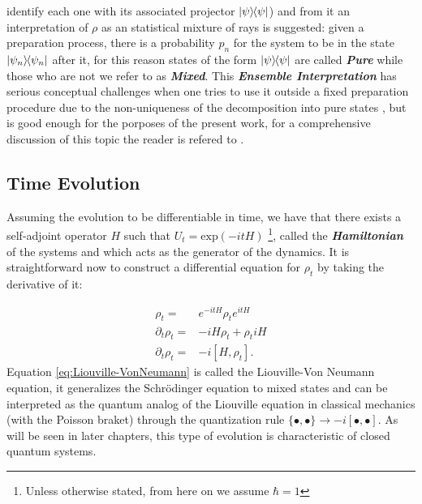 identify each one with its associated projector $\ketbra{\psi}$) and from it an  interpretation of $\rho$ as an statistical mixture of rays is
suggested: given a preparation process, there is a probability $p_{n}$ for the system to be in the state $\ketbra{\psi_{n}}$ after it, for this
reason states of the form $\ketbra{\psi}$ are called \textbf{\textit{Pure}} while those who are not we refer to as \textbf{\textit{Mixed}}.
This \textbf{\textit{Ensemble Interpretation}} has serious conceptual challenges when one tries to use it outside a
fixed preparation procedure due to the non-uniqueness of the decomposition into pure states \cite{nielsen_quantum_2010},
but is good enough for the porposes of the present work, for a comprehensive discussion of this
topic the reader is refered to \cite{schlosshauer_decoherence_2007}.
\subsection{Time Evolution}
Assuming the evolution to be differentiable in time, we have that there exists a self-adjoint operator $H$ such that $U_{t} = \mathrm{exp}(-itH)$
\footnote{Unless otherwise stated, from here on we assume $\hbar=1$}, called the \textbf{\textit{Hamiltonian}} of the systems and which
acts as the generator of the dynamics. It is straightforward now to construct a differential equation for $\rho_{t}$ by taking the derivative
of it:

\begin{align}
  \rho_{t}=& e^{-itH}\rho_{t}  e^{itH}\\
  \partial_{t}\rho_{t} =& -iH\rho_{t} + \rho_{t}iH\\
  \partial_{t}\rho_{t} =& -i[H, \rho_{t}]\label{eq:Liouville-VonNeumann}.
\end{align}
Equation \eqref{eq:Liouville-VonNeumann} is called the Liouville-Von Neumann equation, it generalizes the  Schr\"{o}dinger equation
to mixed states and can be interpreted as the quantum analog of the Liouville equation in classical mechanics (with the Poisson braket) through
the quantization rule $\{\bullet,\bullet\} \to -i[\bullet,\bullet]$. As will be seen in later chapters, this type of evolution is characteristic
of closed quantum systems.
